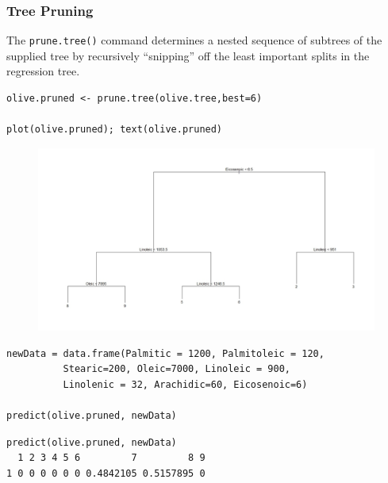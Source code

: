\documentclass[caret-main.tex]{subfiles}
\begin{document}
\subsubsection{Tree Pruning}
The \texttt{prune.tree()} command determines a nested sequence of subtrees of the supplied tree by recursively “snipping” off the least important splits in the regression tree.
\begin{framed}
\begin{verbatim}
olive.pruned <- prune.tree(olive.tree,best=6)

plot(olive.pruned); text(olive.pruned)
\end{verbatim}
\end{framed}
\begin{figure}[h!]
\centering
\includegraphics[width=1.19\linewidth]{./DAquiz6q5b}
\caption{}
\label{fig:DAquiz6q5b}
\end{figure}
\newpage
\begin{framed}
\begin{verbatim}
newData = data.frame(Palmitic = 1200, Palmitoleic = 120, 
          Stearic=200, Oleic=7000, Linoleic = 900, 
          Linolenic = 32, Arachidic=60, Eicosenoic=6)

predict(olive.pruned, newData)
\end{verbatim}
\end{framed}

\begin{verbatim}
predict(olive.pruned, newData)
  1 2 3 4 5 6         7         8 9
1 0 0 0 0 0 0 0.4842105 0.5157895 0
\end{verbatim}
\end{document}
